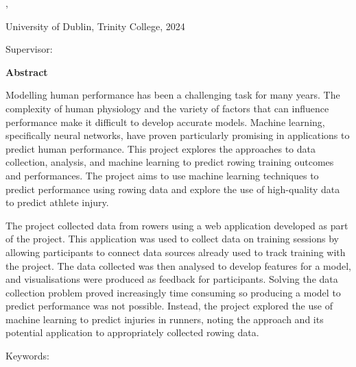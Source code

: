 \thispagestyle{plain}
\begin{center}
  \vspace{3cm}
  \textbf{\Huge\thesistitle}

  \thesissubtitle

  \authorname, \degree

  University of Dublin, Trinity College, 2024

  Supervisor: \supervisor

  \vspace{2cm}
  \textbf{Abstract}
\end{center}


Modelling human performance has been a challenging task for many years. The complexity of human physiology and the variety of factors that can influence performance make it difficult to develop accurate models. Machine learning, specifically neural networks, have proven particularly promising in applications to predict human performance. This project explores the approaches to data collection, analysis, and machine learning to predict rowing training outcomes and performances. The project aims to use machine learning techniques to predict performance using rowing data and explore the use of high-quality data to predict athlete injury. 

The project collected data from rowers using a web application developed as part of the project. This application was used to collect data on training sessions by allowing participants to connect data sources already used to track training with the project. The data collected was then analysed to develop features for a model, and visualisations were produced as feedback for participants. Solving the data collection problem proved increasingly time consuming so producing a model to predict performance was not possible. Instead, the project explored the use of machine learning to predict injuries in runners, noting the approach and its potential application to appropriately collected rowing data.

Keywords: \keywords